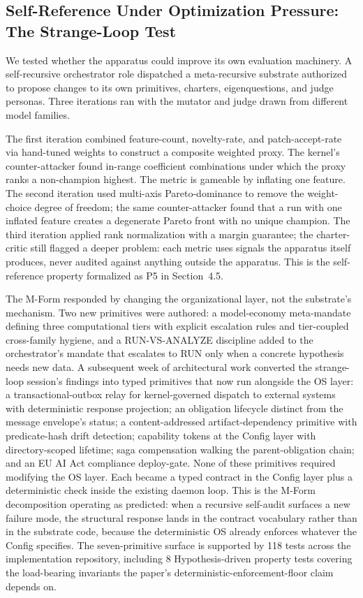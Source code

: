 \documentclass[11pt]{article}
\begin{document}
\subsection{Self-Reference Under Optimization Pressure: The Strange-Loop Test}
\label{app:strange-loop}

We tested whether the apparatus could improve its own evaluation machinery. A self-recursive orchestrator role dispatched a meta-recursive substrate authorized to propose changes to its own primitives, charters, eigenquestions, and judge personas. Three iterations ran with the mutator and judge drawn from different model families.

The first iteration combined feature-count, novelty-rate, and patch-accept-rate via hand-tuned weights to construct a composite weighted proxy. The kernel's counter-attacker found in-range coefficient combinations under which the proxy ranks a non-champion highest. The metric is gameable by inflating one feature. The second iteration used multi-axis Pareto-dominance to remove the weight-choice degree of freedom; the same counter-attacker found that a run with one inflated feature creates a degenerate Pareto front with no unique champion. The third iteration applied rank normalization with a margin guarantee; the charter-critic still flagged a deeper problem: each metric uses signals the apparatus itself produces, never audited against anything outside the apparatus. This is the self-reference property formalized as P5 in Section~4.5.

The M-Form responded by changing the organizational layer, not the substrate's mechanism. Two new primitives were authored: a model-economy meta-mandate defining three computational tiers with explicit escalation rules and tier-coupled cross-family hygiene, and a RUN-VS-ANALYZE discipline added to the orchestrator's mandate that escalates to RUN only when a concrete hypothesis needs new data. A subsequent week of architectural work converted the strange-loop session's findings into typed primitives that now run alongside the OS layer: a transactional-outbox relay for kernel-governed dispatch to external systems with deterministic response projection; an obligation lifecycle distinct from the message envelope's status; a content-addressed artifact-dependency primitive with predicate-hash drift detection; capability tokens at the Config layer with directory-scoped lifetime; saga compensation walking the parent-obligation chain; and an EU AI Act compliance deploy-gate. None of these primitives required modifying the OS layer. Each became a typed contract in the Config layer plus a deterministic check inside the existing daemon loop. This is the M-Form decomposition operating as predicted: when a recursive self-audit surfaces a new failure mode, the structural response lands in the contract vocabulary rather than in the substrate code, because the deterministic OS already enforces whatever the Config specifies. The seven-primitive surface is supported by 118 tests across the implementation repository, including 8 Hypothesis-driven property tests covering the load-bearing invariants the paper's deterministic-enforcement-floor claim depends on.
\end{document}
